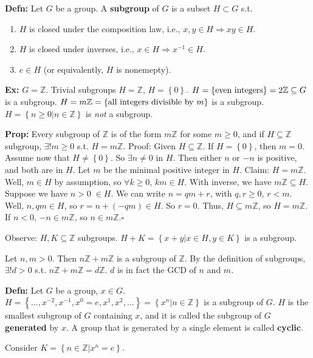 \documentclass[10pt,letterpaper]{article}
\newcommand{\n}{\hfill\break}
\newcommand{\defn}[1]{\par\noindent\settowidth{\hangindent}{\textbf{Defn: }}\textbf{Defn: }#1\n}
\newcommand{\prop}[1]{\par\noindent\settowidth{\hangindent}{\textbf{Prop: }}\textbf{Prop: }#1\n}
\newcommand{\ex}[1]{\par\noindent\settowidth{\hangindent}{\textbf{Ex: }}\textbf{Ex: }#1\n}
\newcommand{\proven}{\;$\square$\n}
\newcommand{\ptxt}[1]{\textrm{\textnormal{#1}}}
\newcommand{\set}[1]{\left\{#1\right\}}
\newcommand{\integers}{\mathbb{Z}}
\newcommand{\Z}{\integers}
\newcommand{\inv}{^{-1}}
\newcommand{\st}{s.t.}
\newcommand{\unique}{!}
\begin{document}
\defn{\!\!\!
	Let $G$ be a group. A \textbf{subgroup} of $G$ is a subset $H\subset{}G$ \st{}
	\begin{enumerate}
		\item $H$ is closed under the composition law, i.e., $x,y\in{}H\Rightarrow{}xy\in{}H$.
		\item $H$ is closed under inverses, i.e., $x\in{}H\Rightarrow{}x\inv\in{}H$.
		\item $e\in{}H$ (or equivalently, $H$ is nonemepty).
	\end{enumerate}
}

\ex{\!\!\!
	$G=\Z$. Trivial subgroups $H=\Z$, $H=\set{0}$.\n
	$H=\set{\ptxt{even integers}}=2\Z\subseteq{}G$ is a subgroup.\n
	$H=m\Z=\set{\ptxt{all integers divisible by }m}$ is a subgroup.\n
	$H=\set{n\ge{}0|n\in\Z}$ is \textit{not} a subgroup.
}

\prop{\!\!\!
	Every subgroup of $\Z$ is of the form $m\Z$ for some $m\ge{}0$, and if $H\subseteq\Z$ subgroup, $\exists\unique{}m\ge{}0$ \st{} $H=m\Z$.\n
	Proof: Given $H\subseteq\Z$. If $H=\set{0}$, then $m=0$.\n
	Assume now that $H\ne\set{0}$. So $\exists{}n\ne{}0$ in $H$. Then either $n$ or $-n$ is positive, and both are in $H$. Let $m$ be the minimal positive integer in $H$.\n
	Claim: $H=m\Z$. Well, $m\in{}H$ by assumption, so $\forall{}k\ge{}0$, $km\in{}H$. With inverse, we have $m\Z\subseteq{}H$. Suppose we have $n>0\;\in{}H$. We can write $n=qm+r$, with $q,r\ge{}0$, $r<m$. Well, $n,qm\in{}H$, so $r=n+(-qm)\in{}H$. So $r=0$. Thus, $H\subseteq{}m\Z$, so $H=m\Z$.\n
	If $n<0$, $-n\in{}m\Z$, so $n\in{}m\Z$.\proven
}

\par\noindent
Observe: $H,K\subseteq\Z$ subgroups. $H+K=\set{x+y|x\in{}H,y\in{}K}$ is a subgroup.\n

\par\noindent
Let $n,m>0$. Then $n\Z+m\Z$ is a subgroup of $\Z$. By the definition of subgroups, $\exists\unique{}d>0$ \st{} $n\Z+m\Z=d\Z$. $d$ is in fact the GCD of $n$ and $m$.\n

\defn{\!\!\!
	Let $G$ be a group, $x\in{}G$. $H=\set{\ldots,x^{-2},x^{-1},x^{0}=e,x^{1},x^{2},\ldots}=\set{x^{n}|n\in\Z}$ is a subgroup of $G$. $H$ is the smallest subgroup of $G$ containing $x$, and it is called the subgroup of $G$ \textbf{generated} by $x$. A group that is generated by a single element is called \textbf{cyclic}.
}

\par\noindent
Consider $K=\set{n\in\Z|x^{n}=e}$.\n
\end{document}

